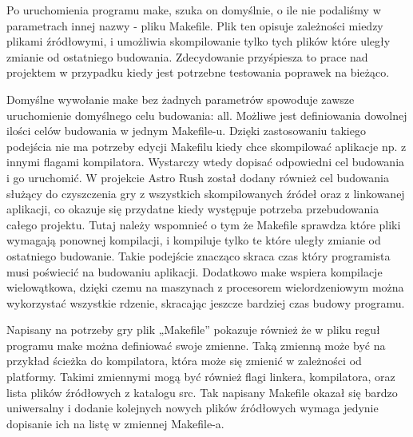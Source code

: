 Po uruchomienia programu make, szuka on domyślnie, o ile nie podaliśmy w parametrach innej nazwy - pliku Makefile. Plik ten opisuje zależności miedzy plikami źródłowymi, i umożliwia skompilowanie tylko tych plików które uległy zmianie od ostatniego budowania. Zdecydowanie przyśpiesza to prace nad projektem w przypadku kiedy jest potrzebne testowania poprawek na bieżąco. 

Domyślne wywołanie make bez żadnych parametrów spowoduje zawsze uruchomienie domyślnego celu budowania: all. Możliwe jest definiowania dowolnej ilości celów budowania w jednym Makefile-u. Dzięki zastosowaniu takiego podejścia nie ma potrzeby edycji Makefilu kiedy chce skompilować aplikacje np. z innymi flagami kompilatora. Wystarczy wtedy dopisać odpowiedni cel budowania i go uruchomić. W projekcie Astro Rush został dodany również cel budowania służący do czyszczenia gry z wszystkich skompilowanych źródeł oraz z linkowanej aplikacji, co okazuje się przydatne kiedy występuje potrzeba przebudowania całego projektu. Tutaj należy wspomnieć o tym że Makefile sprawdza które pliki wymagają ponownej kompilacji, i kompiluje tylko te które uległy zmianie od ostatniego budowanie. Takie podejście znacząco skraca czas który programista musi poświecić na budowaniu aplikacji. Dodatkowo make wspiera kompilacje wielowątkowa, dzięki czemu na maszynach z procesorem wielordzeniowym można wykorzystać wszystkie rdzenie, skracając jeszcze bardziej czas budowy programu. 

Napisany na potrzeby gry plik „Makefile” pokazuje również że w pliku reguł programu make można definiować swoje zmienne. Taką zmienną może być na przykład ścieżka do kompilatora, która może się zmienić w zależności od platformy. Takimi zmiennymi mogą być również flagi linkera, kompilatora, oraz lista plików źródłowych z katalogu src. Tak napisany Makefile okazał się bardzo uniwersalny i dodanie kolejnych nowych plików źródłowych wymaga jedynie dopisanie ich na listę w zmiennej Makefile-a. 

